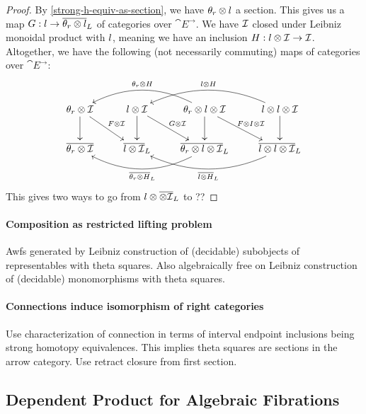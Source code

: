 \documentclass[reqno,10pt,a4paper,oneside]{amsart}
\begin{document}
\begin{proof}
By \cref{strong-h-equiv-as-section}, we have $\thetar \otimes \intervall$ a section.
This gives us a map $G : \intervall \to \overline{\thetar \otimes \intervall}_L$ of categories over $\cat{E}^{\to}$.
We have $\cal{I}$ closed under Leibniz monoidal product with $\intervall$, meaning we have an inclusion $H : \intervall \otimes \cal{I} \to \cal{I}$.
Altogether, we have the following (not necessarily commuting) maps of categories over $\cat{E}^{\to}$:
\[
\xymatrix{
  \thetar \otimes \cal{I}
  \ar[d]
  \ar[dr]^{F \otimes \cal{I}}
&
  \intervall \otimes \cal{I}
  \ar[d]
  \ar[dr]^{G \otimes \cal{I}}
&
  \thetar \otimes \intervall \otimes \cal{I}
  \ar[d]
  \ar[dr]^{F \otimes \interval \otimes \cal{I}}
  \ar@/_2em/[ll]_{\thetar \otimes H}
&
  \intervall \otimes \intervall \otimes \cal{I}
  \ar[d]
  \ar@/_2em/[ll]_{\intervall \otimes H}
\\
  \overline{\thetar \otimes \cal{I}}
&
  \overline{\intervall \otimes \cal{I}}_L
&
  \overline{\thetar \otimes \intervall \otimes \cal{I}}_L
  \ar@/^2em/[ll]^{\overline{\thetar \otimes H}_L}
&
  \overline{\intervall \otimes \intervall \otimes \cal{I}}_L
  \ar@/^2em/[ll]^{\overline{\intervall \otimes H}_L}
}
\]
This gives two ways to go from $\intervall \otimes \overline{ \otimes \cal{I}}_L$ to ??

\end{proof}



\paragraph{Composition as restricted lifting problem}

Awfs generated by Leibniz construction of (decidable) subobjects of representables with theta squares.
Also algebraically free on Leibniz construction of (decidable) monomorphisms with theta squares.

\paragraph{Connections induce isomorphism of right categories}

Use characterization of connection in terms of interval endpoint inclusions being strong homotopy equivalences.
This implies theta squares are sections in the arrow category.
Use retract closure from first section.

\subsection{Dependent Product for Algebraic Fibrations}
\end{document}
